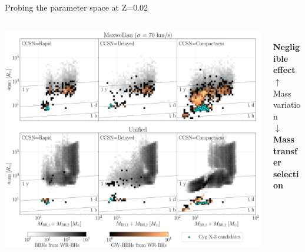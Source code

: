 \documentclass{beamer} %
\begin{document}
\begin{frame}{Probing the parameter space at Z=0.02}
	\begin{columns}
		\begin{column}{0.9\textwidth}
			\includegraphics[width=\textwidth]{./images/kickcompare_rem_02_beamer.pdf}
		\end{column}
		\begin{column}{0.25\textwidth}
			\scriptsize
			\centering
			\\
			\bigskip
			\textbf{Negligible effect}\\
			\bigskip
			$\uparrow$ \\
			\bigskip
			Mass variation \\
			\bigskip
			$\downarrow$\\
			\bigskip
			\textbf{Mass transfer \\ selection}\\
			\bigskip
		\end{column}	
	\end{columns}
	
\end{frame}
\end{document}
